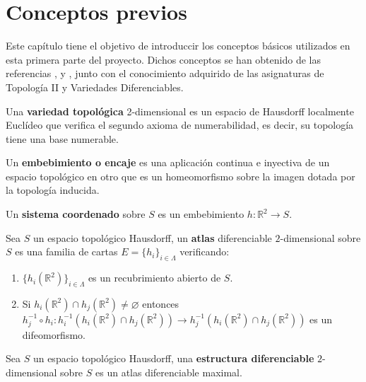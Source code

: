 
\chapter{Conceptos previos}

Este capítulo tiene el objetivo de introduccir los conceptos básicos utilizados en esta primera parte del proyecto. Dichos conceptos se han obtenido de las referencias \cite{MorseTh1}, \cite{MorseTh2} y \cite{Triangulacion}, junto con el conocimiento adquirido de las asignaturas de Topología II y Variedades Diferenciables.

\begin{definicion} Una \textbf{variedad topológica} 2-dimensional es un espacio de Hausdorff localmente Euclídeo que verifica el segundo axioma de numerabilidad, es decir, su topología tiene una base numerable.
\end{definicion}

\begin{definicion} Un \textbf{embebimiento o encaje} es una aplicación continua e inyectiva de un espacio topológico en otro que es un homeomorfismo sobre la imagen dotada por la topología inducida.
\end{definicion}

\begin{definicion} Un \textbf{sistema coordenado} sobre $S$ es un embebimiento $h : \mathbb{R}^2 \rightarrow S$.
\end{definicion}

\begin{definicion} Sea $S$ un espacio topológico Hausdorff, un \textbf{atlas} diferenciable $2$-dimensional sobre $S$ es una familia de cartas $E=\{h_i\}_{i\in \Lambda}$ verificando:
	\begin{enumerate}
		\item $\{h_i(\mathbb{R}^2)\}_{i\in \Lambda}$ es un recubrimiento abierto de $S$.
		\item Si $h_i(\mathbb{R}^2) \cap h_j(\mathbb{R}^2) \neq \varnothing$ entonces $h_j^{-1} \circ h_i:h_i^{-1}(h_i(\mathbb{R}^2)\cap h_j(\mathbb{R}^2)) \rightarrow h_j^{-1}(h_i(\mathbb{R}^2)\cap h_j(\mathbb{R}^2))$ es un difeomorfismo.
	\end{enumerate}
\end{definicion}

\begin{definicion} Sea $S$ un espacio topológico Hausdorff, una \textbf{estructura diferenciable} $2$-dimensional sobre $S$ es un atlas diferenciable maximal.
\end{definicion}

